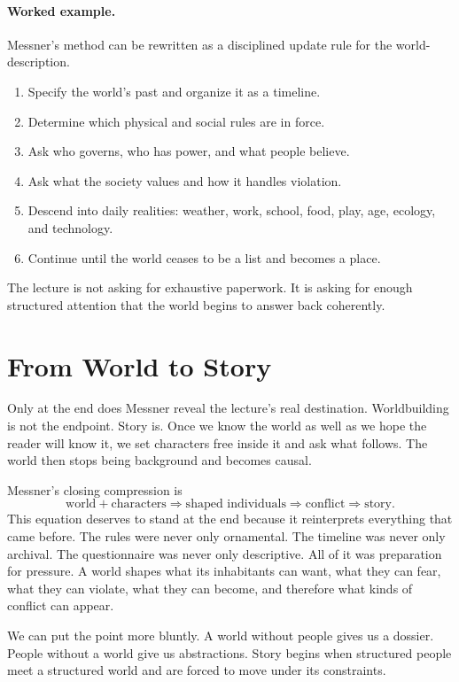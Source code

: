 \paragraph{Worked example.} Messner's method can be rewritten as a disciplined update rule for the world-description.
\begin{enumerate}
\item Specify the world's past and organize it as a timeline.
\item Determine which physical and social rules are in force.
\item Ask who governs, who has power, and what people believe.
\item Ask what the society values and how it handles violation.
\item Descend into daily realities: weather, work, school, food, play, age, ecology, and technology.
\item Continue until the world ceases to be a list and becomes a place.
\end{enumerate}
The lecture is not asking for exhaustive paperwork. It is asking for enough structured attention that the world begins to answer back coherently.

\section{From World to Story}

Only at the end does Messner reveal the lecture's real destination. Worldbuilding is not the endpoint. Story is. Once we know the world as well as we hope the reader will know it, we set characters free inside it and ask what follows. The world then stops being background and becomes causal.

Messner's closing compression is
\begin{equation}
\text{world} + \text{characters} \Rightarrow \text{shaped individuals} \Rightarrow \text{conflict} \Rightarrow \text{story}.
\end{equation}
This equation deserves to stand at the end because it reinterprets everything that came before. The rules were never only ornamental. The timeline was never only archival. The questionnaire was never only descriptive. All of it was preparation for pressure. A world shapes what its inhabitants can want, what they can fear, what they can violate, what they can become, and therefore what kinds of conflict can appear.

We can put the point more bluntly. A world without people gives us a dossier. People without a world give us abstractions. Story begins when structured people meet a structured world and are forced to move under its constraints.

